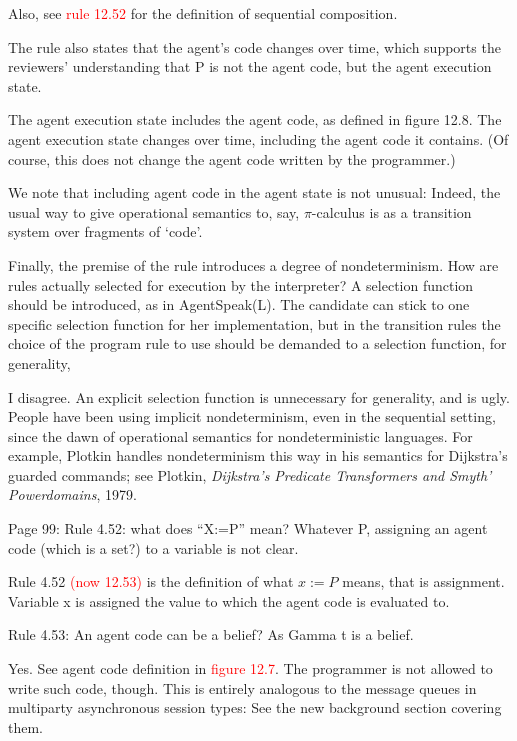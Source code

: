 \documentclass{article}
\newcommand*\R[1]{\textcolor{red}{#1}} %
\newenvironment{them}{\noindent\begingroup\color{blue}}{\endgroup\par}
\begin{document}
Also, see \R{rule 12.52} for the definition of sequential composition.


\begin{them}

The rule also states that the agent's code changes over time, which supports
the reviewers' understanding that P is not the agent code, but the agent
execution state.

\end{them}
The agent execution state includes the agent code, as defined in figure 12.8. The agent execution state changes over time,
  including the agent code it contains.
(Of course, this does not change the agent code written by the programmer.)

We note that including agent code in the agent state is not unusual:
  Indeed, the usual way to give operational semantics to, say,
    $\pi$-calculus is as a transition system over fragments of `code'.

\begin{them}

Finally, the premise of the rule introduces a degree of nondeterminism. How are
rules actually selected for execution by the interpreter? A selection function
should be introduced, as in AgentSpeak(L). The candidate can stick to one
specific selection function for her implementation, but in the transition rules
the choice of the program rule to use should be demanded to a selection
function, for generality,

\end{them}
I disagree.
An explicit selection function is unnecessary for generality, and is ugly.
People have been using implicit nondeterminism,
  even in the sequential setting,
  since the dawn of operational semantics for nondeterministic languages.
For example,
  Plotkin handles nondeterminism this way in his semantics for
  Dijkstra's guarded commands;
see Plotkin, {\it Dijkstra's Predicate Transformers and Smyth' Powerdomains},
  1979.


\begin{them}

Page 99:
Rule 4.52: what does ``X:=P'' mean? Whatever P, assigning an agent code (which is
a set?) to a variable is not clear.

\end{them}
Rule 4.52 \R{(now 12.53)} is the definition of what $x:=P$ means, that is
assignment. Variable x is assigned the value to which the agent code is
evaluated to.

\begin{them}

Rule 4.53:
An agent code can be a belief? As Gamma t is a belief.
\end{them}
Yes. See agent code definition in \R{figure 12.7}.
The programmer is not allowed to write such code, though.
This is entirely analogous to the message queues in
  multiparty asynchronous session types:
  See the new background section covering them.
\end{document}
